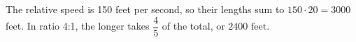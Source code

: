 The relative speed is 150 feet per second, so their lengths sum to $150\cdot20=3000$ feet. In ratio 4:1, the longer takes $\dfrac{4}{5}$ of the total, or $\boxed{2400\text{ feet}}$.
